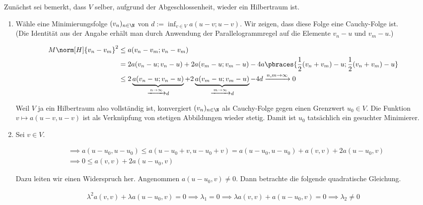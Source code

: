 \begin{solution}

Zunächst sei bemerkt, dass $V$ selber, aufgrund der Abgeschlossenheit, wieder ein Hilbertraum ist.

\begin{enumerate}[label = \textbf{\alph*)}]

  \item Wähle eine Minimierungsfolge $(v_n)_{n \in \N}$ von $d := \inf_{v \in V} a(u - v; u - v)$.
  Wir zeigen, dass diese Folge eine Cauchy-Folge ist. \\
  (Die Identität aus der Angabe erhält man durch Anwendung der Parallelogrammregel
  auf die Elemente $v_n -u$ und $v_m - u$.)

  \begin{align*}
    M \norm[H]{v_n - v_m}^2
    & \leq
    a(v_n - v_m; v_n - v_m ) \\
    &=
    2 a(v_n - u; v_n - u)
    +
    2 a(v_m - u; v_m - u)
    -
    4 a\pbraces
  {
    \frac{1}{2}(v_n + v_m) - u;
    \frac{1}{2}(v_n + v_m) - u
  } \\
  & \leq
  2 \underbrace
  {
    a(v_n - u; v_n - u)
  }_{
    \xrightarrow{n \to \infty} d
  }
  +
  2 \underbrace{
    a(v_m - u; v_m - u)
  }_{
    \xrightarrow{m \to \infty} d
  }
  - 4d
  \xrightarrow{n, m \to \infty} 0
  \end{align*}

  Weil $V$ ja ein Hilbertraum also vollständig ist, konvergiert $(v_n)_{n \in \N}$ als Cauchy-Folge gegen einen Grenzwert $u_0 \in V$.
  Die Funktion $v \mapsto a(u - v, u - v)$ ist als Verknüpfung von stetigen Abbildungen wieder stetig.
  Damit ist $u_0$ tatsächlich ein gesuchter Minimierer.

  \item Sei $v \in V$.

  \begin{align*}
    & \implies
    a(u - u_0, u - u_0)
    \leq
    a(u - u_0 + v, u - u_0 + v)
    =
    a(u - u_0, u - u_0) + a(v, v) + 2 a(u - u_0, v) \\
    & \implies
    0 \leq a(v, v) + 2 a(u - u_0, v)
  \end{align*}

  Dazu leiten wir einen Widerspruch her.
  Angenommen $a(u - u_0, v) \neq 0$.
  Dann betrachte die folgende quadratische Gleichung.

  \begin{align*}
    \lambda^2 a(v, v) + \lambda a(u - u_0, v) = 0
    \implies
    \lambda_1 = 0
    \implies
    \lambda a(v, v) + a(u - u_0, v) = 0
    \implies
    \lambda_2 \neq 0
  \end{align*}


\end{enumerate}
\end{solution}
